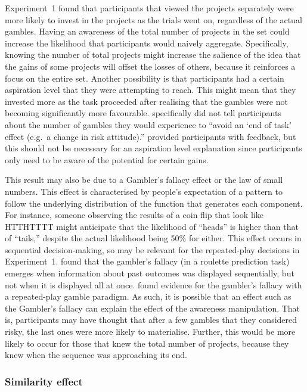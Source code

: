 \documentclass[a4paper, nobind, dvipsnames]{templates/ociamthesis}
\theoremstyle{definition}
\theoremstyle{definition}
\theoremstyle{definition}
\theoremstyle{definition}
\theoremstyle{remark}
\begin{document}
Experiment~1 found that participants that viewed the projects separately were
more likely to invest in the projects as the trials went on, regardless of the
actual gambles. Having an awareness of the total number of projects in the set
could increase the likelihood that participants would naively aggregate.
Specifically, knowing the number of total projects might increase the salience
of the idea that the gains of some projects will offset the losses of others,
because it reinforces a focus on the entire set. Another possibility is that
participants had a certain aspiration level \autocite{lopes1996} that they were
attempting to reach. This might mean that they invested more as the task
proceeded after realising that the gambles were not becoming significantly more
favourable. \textcite[p.~219]{barron2003} specifically did not tell participants about
the number of gambles they would experience to ``avoid an `end of task' effect
(e.g.~a change in risk attitude).'' \textcite{barron2003} provided participants with
feedback, but this should not be necessary for an aspiration level explanation
since participants only need to be aware of the potential for certain gains.

This result may also be due to a Gambler's fallacy effect or the law of small
numbers. This effect is characterised by people's expectation of a pattern to
follow the underlying distribution of the function that generates each
component. For instance, someone observing the results of a coin flip that look
like HTTHTTTT might anticipate that the likelihood of ``heads'' is higher than
that of ``tails,'' despite the actual likelihood being 50\% for either. This effect
occurs in sequential decision-making, so may be relevant for the repeated-play
decisions in Experiment~1. \textcite{barron2010} found that the gambler's fallacy (in a
roulette prediction task) emerges when information about past outcomes was
displayed sequentially, but not when it is displayed all at once. \textcite{haisley2008}
found evidence for the gambler's fallacy with a repeated-play gamble paradigm.
As such, it is possible that an effect such as the Gambler's fallacy can explain
the effect of the awareness manipulation. That is, participants may have thought
that after a few gambles that they considered risky, the last ones were more
likely to materialise. Further, this would be more likely to occur for those
that knew the total number of projects, because they knew when the sequence was
approaching its end.

\hypertarget{similarity-discussion-aggregation-1}{%
\subsubsection{Similarity effect}\label{similarity-discussion-aggregation-1}}
\end{document}
